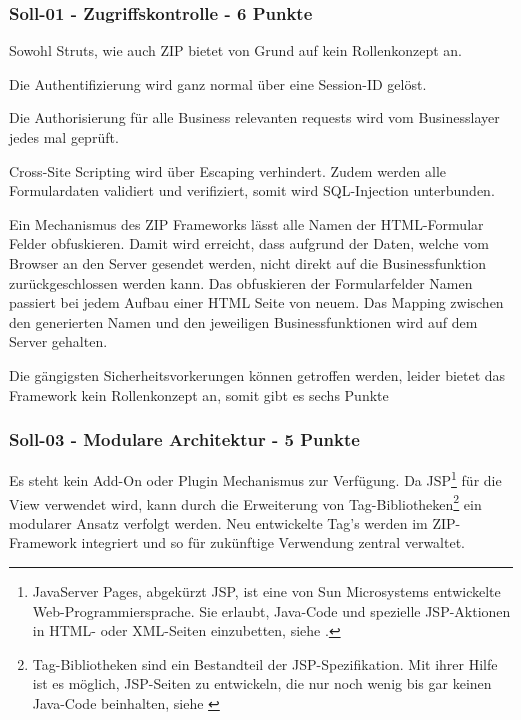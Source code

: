   \subsubsection{Soll-01 - Zugriffskontrolle - 6 Punkte}
  
  Sowohl Struts, wie auch \ac{ZIP} bietet von Grund auf kein Rollenkonzept an.
  
  Die Authentifizierung wird ganz normal über eine Session-ID gelöst.
  
  Die Authorisierung für alle Business relevanten requests wird vom
  Businesslayer jedes mal geprüft.
  
  Cross-Site Scripting wird über Escaping verhindert. Zudem werden alle
  Formulardaten validiert und verifiziert, somit wird SQL-Injection unterbunden.
  
  Ein Mechanismus des \ac{ZIP} Frameworks lässt alle Namen der
  \ac{HTML}-Formular Felder obfuskieren. Damit wird erreicht, dass aufgrund
  der Daten, welche vom Browser an den Server gesendet werden, nicht direkt
  auf die Businessfunktion zurückgeschlossen werden kann. Das obfuskieren der
  Formularfelder Namen passiert bei jedem Aufbau einer HTML Seite von neuem. Das
  Mapping zwischen den generierten Namen und den jeweiligen Businessfunktionen
  wird auf dem Server gehalten.
  
  Die gängigsten Sicherheitsvorkerungen können getroffen werden, leider bietet
  das Framework kein Rollenkonzept an, somit gibt es sechs Punkte
  
  \subsubsection{Soll-03 - Modulare Architektur - 5 Punkte}
  
  Es steht kein Add-On oder Plugin Mechanismus zur Verfügung. Da
  \ac{JSP}\footnote{JavaServer Pages, abgekürzt JSP, ist eine von Sun
  Microsystems entwickelte Web-Programmiersprache. Sie erlaubt, Java-Code und
  spezielle JSP-Aktionen in HTML- oder XML-Seiten einzubetten, siehe
  \cite{JavaServerPages}.} für die View verwendet wird, kann durch die
  Erweiterung von Tag-Bibliotheken\footnote{Tag-Bibliotheken sind ein
  Bestandteil der JSP-Spezifikation. Mit ihrer Hilfe ist es möglich, JSP-Seiten
  zu entwickeln, die nur noch wenig bis gar keinen Java-Code beinhalten, siehe
  \cite{TagLibrary}} ein modularer Ansatz verfolgt werden. Neu entwickelte
  Tag's werden im ZIP-Framework integriert und so für zukünftige Verwendung
  zentral verwaltet.
  
